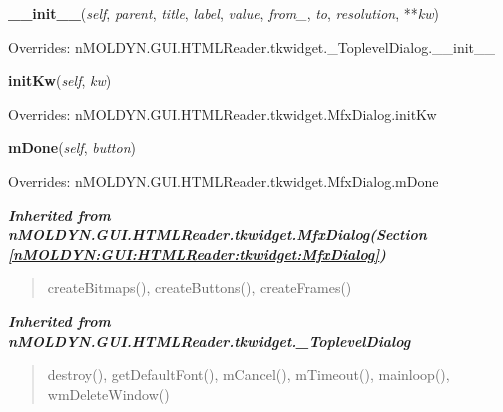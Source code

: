 \hspace{.8\funcindent}\begin{boxedminipage}{\funcwidth}

    \raggedright \textbf{\_\_init\_\_}(\textit{self}, \textit{parent}, \textit{title}, \textit{label}, \textit{value}, \textit{from\_}, \textit{to}, \textit{resolution}, **\textit{kw})

\setlength{\parskip}{2ex}
\setlength{\parskip}{1ex}
      Overrides: nMOLDYN.GUI.HTMLReader.tkwidget.\_ToplevelDialog.\_\_init\_\_

    \end{boxedminipage}

    \vspace{0.5ex}

\hspace{.8\funcindent}\begin{boxedminipage}{\funcwidth}

    \raggedright \textbf{initKw}(\textit{self}, \textit{kw})

\setlength{\parskip}{2ex}
\setlength{\parskip}{1ex}
      Overrides: nMOLDYN.GUI.HTMLReader.tkwidget.MfxDialog.initKw

    \end{boxedminipage}

    \vspace{0.5ex}

\hspace{.8\funcindent}\begin{boxedminipage}{\funcwidth}

    \raggedright \textbf{mDone}(\textit{self}, \textit{button})

\setlength{\parskip}{2ex}
\setlength{\parskip}{1ex}
      Overrides: nMOLDYN.GUI.HTMLReader.tkwidget.MfxDialog.mDone

    \end{boxedminipage}


\large{\textbf{\textit{Inherited from nMOLDYN.GUI.HTMLReader.tkwidget.MfxDialog\textit{(Section \ref{nMOLDYN:GUI:HTMLReader:tkwidget:MfxDialog})}}}}

\begin{quote}
createBitmaps(), createButtons(), createFrames()
\end{quote}

\large{\textbf{\textit{Inherited from nMOLDYN.GUI.HTMLReader.tkwidget.\_ToplevelDialog}}}

\begin{quote}
destroy(), getDefaultFont(), mCancel(), mTimeout(), mainloop(), wmDeleteWindow()
\end{quote}

